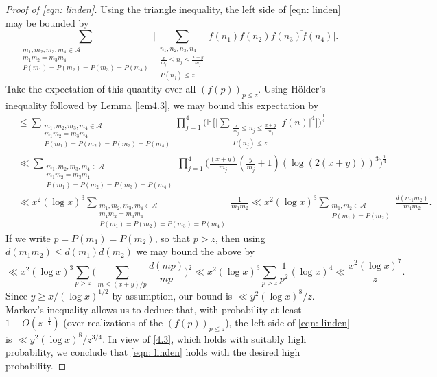 \documentclass[12pt, notitlepage]{amsart}
\numberwithin{equation}{section}
\def\E{\mathbb E}
\def\CA{\mathcal{A}}
\theoremstyle{remark}
\theoremstyle{definition}
\theoremstyle{remark}
\numberwithin{equation}{section}
\begin{document}
 \begin{proof}[Proof of \eqref{eqn: linden}] Using the triangle inequality, the left side of \eqref{eqn: linden} may be bounded by 
 $$ 
\sum_{\substack{ m_1, m_2, m_3, m_4 \in \CA \\ m_1 m_2= m_3 m_4  \\ P(m_1)=P(m_2) =P(m_3)=P(m_4)}} \Big|\sum_{\substack{n_1, n_2, n_3, n_4 
\\ \frac{x}{m_j} \le n_j \le \frac{x+y}{m_j} \\ P(n_j)\le z}} f(n_1)f(n_2)\overline{f(n_3) f(n_4)}  \Big|.         
$$ 
Take the expectation of this quantity over all $(f(p))_{p\le z}$.  Using H{\" o}lder's inequality followed by Lemma \ref{lem4.3}, we may bound this expectation by 
\begin{align*}
&\le 
 \sum_{\substack{ m_1, m_2, m_3, m_4 \in \CA \\ m_1 m_2= m_3 m_4  \\ P(m_1)=P(m_2) =P(m_3)=P(m_4)}}  \prod_{j=1}^{4} 
 \Big( \E \Big[ \Big| \sum_{\substack{\frac x{m_j} \le n_j \le \frac{x+y}{m_j} \\ P(n_j) \le z} } f(n)\Big|^4 \Big]\Big)^{\frac 14} 
\\
&\ll  \sum_{\substack{ m_1, m_2, m_3, m_4 \in \CA \\ m_1 m_2= m_3 m_4  \\ P(m_1)=P(m_2) =P(m_3)=P(m_4)}}  \prod_{j=1}^{4} 
\Big( \frac{(x+y)}{m_j} \left(\frac{y}{m_j} + 1 \right) (\log (2(x+y)))^3 \Big)^{\frac 14}  \\ 
&\ll x^2 (\log x)^3  \sum_{\substack{ m_1, m_2, m_3, m_4 \in \CA \\ m_1 m_2= m_3 m_4  \\ P(m_1)=P(m_2) =P(m_3)=P(m_4)}}  \frac{1}{m_1 m_2}
\ll  x^2 (\log x)^3 \sum_{\substack{m_1, m_2 \in {\mathcal A} \\ P(m_1) = P(m_2)}} \frac{d(m_1 m_2)}{m_1 m_2}. 
\end{align*}
If we write $p=P(m_1)=P(m_2)$, so that $p > z$, then using $d(m_1m_2) \le d(m_1) d(m_2)$ we may bound the above by 
$$ 
\ll x^2 (\log x)^3 \sum_{p>z} \Big( \sum_{m \le (x+y)/p} \frac{d(mp)}{mp}\Big)^2 \ll x^2 (\log x)^3 \sum_{p> z} \frac{1}{p^2} (\log x)^4 \ll \frac{ x^2 (\log x)^7 }{z}. 
$$  
Since $y \geq x/(\log x)^{1/2}$ by assumption, our bound is $\ll y^2 (\log x)^{8}/{z}$. Markov's inequality allows us to deduce that, with probability at least $1- O(z^{-\frac 14})$ (over realizations of the $(f(p))_{p\le z}$), the left side of \eqref{eqn: linden} is  $\ll y^{2} (\log x)^{8}/{z^{3/4}}$.   In view of \eqref{4.3}, which holds with suitably high probability, we conclude that \eqref{eqn: linden} holds with the desired high probability.  
 \end{proof} 
 
\end{document}
